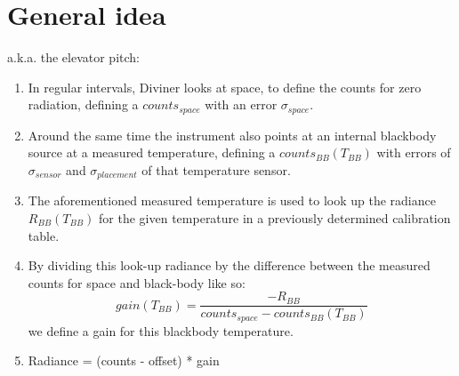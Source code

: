 \section{General idea}
a.k.a. the elevator pitch:

\begin{enumerate}
\item In regular intervals, Diviner looks at space, to define the counts for zero radiation, defining a $counts_{space}$ with an error $\sigma_{space}$. 
\item Around the same time the instrument also points at an internal blackbody source at a measured temperature, defining a $counts_{BB}\left(T_{BB}\right)$ with errors of $\sigma_{sensor}$ and $\sigma_{placement}$ of that temperature sensor.
\item The aforementioned measured temperature is used to look up the radiance $R_{BB}\left(T_{BB}\right)$ for the given temperature in a previously determined calibration table.
\item By dividing this look-up radiance by the difference between the measured counts for space and black-body like so: $$ gain\left(T_{BB}\right) = \frac{-R_{BB}}{counts_{space} - counts_{BB}\left(T_{BB}\right)} $$ we define a gain for this blackbody temperature.
\item Radiance = (counts - offset) * gain
\end{enumerate}